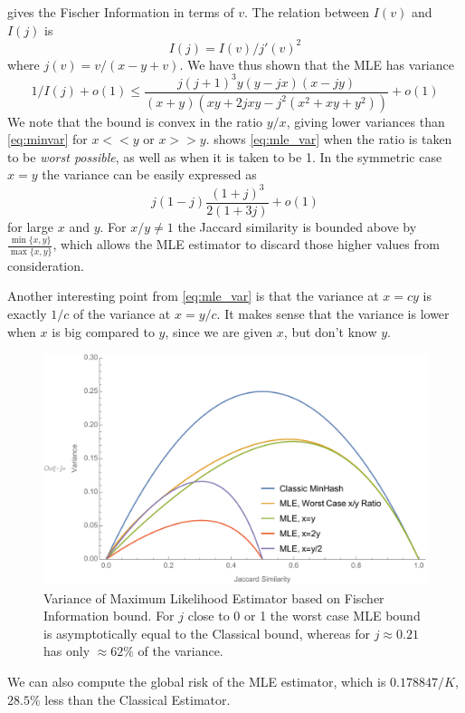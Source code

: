  gives the Fischer Information in terms of $v$.
The relation between $I(v)$ and $I(j)$ is
\[
   I(j) = I(v)/j'(v)^2
\]
where $j(v) = v/(x-y+v)$.
We have thus shown that the MLE has variance
\[
   1/I(j) + o(1)
   \le
   \frac{j (j+1)^3 y (y-j x) (x-j y)}{(x+y) \left(x y +2jxy -j^2 \left(x^2+x y+y^2\right)\right)}
   + o(1)
   \label{eq:mle_var}
\]
We note that the bound is convex in the ratio $y/x$, giving lower variances than \cref{eq:minvar} for $x<\!<y$ or $x >\!> y$.
 shows \cref{eq:mle_var} when the ratio is taken to be \emph{worst possible}, as well as when it is taken to be 1.
In the symmetric case $x=y$ the variance can be easily expressed as
\[
   j(1-j)\frac{(1+j)^3}{2(1+3j)} + o(1)
\]
for large $x$ and $y$.
For $x/y\neq1$ the Jaccard similarity is bounded above by $\frac{\min\{x,y\}}{\max\{x,y\}}$, which allows the MLE estimator to discard those higher values from consideration.

Another interesting point from \cref{eq:mle_var} is that the variance at $x=cy$ is exactly $1/c$ of the variance at $x=y/c$.
It makes sense that the variance is lower when $x$ is big compared to $y$, since we are given $x$, but don't know $y$.

\begin{figure}
\includegraphics[trim=30 0 0 0,clip,width=\linewidth]{figures/mle_variance2}
\caption{Variance of Maximum Likelihood Estimator based on Fischer Information bound.
For $j$ close to 0 or 1 the worst case MLE bound is asymptotically equal to the Classical bound, whereas for $j\approx 0.21$ has only $\approx 62\%$ of the variance.}
\label{fig:mle_variance}
\end{figure}

We can also compute the global risk of the MLE estimator, which is $0.178847/K$, $28.5\%$ less than the Classical Estimator.

